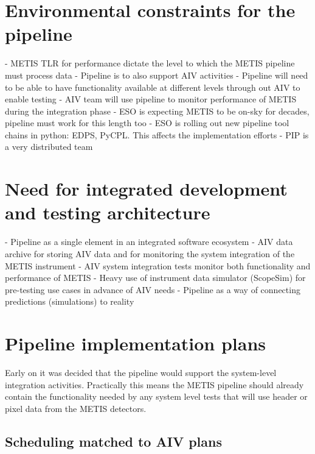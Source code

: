 \documentclass[a4paper]{spie}  %
\begin{document}
\section{Environmental constraints for the pipeline}
\label{sec:env}




- METIS TLR for performance dictate the level to which the METIS pipeline must process data
- Pipeline is to also support AIV activities
- Pipeline will need to be able to have functionality available at different levels through out AIV to enable testing
- AIV team will use pipeline to monitor performance of METIS during the integration phase
- ESO is expecting METIS to be on-sky for decades, pipeline must work for this length too
- ESO is rolling out new pipeline tool chains in python: EDPS, PyCPL. This affects the implementation efforts
- PIP is a very distributed team

\section{Need for integrated development and testing architecture}
\label{sec:dev}
- Pipeline as a single element in an integrated software ecosystem
- AIV data archive for storing AIV data and for monitoring the system integration of the METIS instrument
- AIV system integration tests monitor both functionality and performance of METIS
- Heavy use of instrument data simulator (ScopeSim) for pre-testing use cases in advance of AIV needs
- Pipeline as a way of connecting predictions (simulations) to reality


\section{Pipeline implementation plans}
\label{sec:imp}

Early on it was decided that the pipeline would support the system-level integration activities.
Practically this means the METIS pipeline should already contain the functionality needed by any system level tests that will use header or pixel data from the METIS detectors.



\subsection{Scheduling matched to AIV plans}
\label{subsec:imp_aiv}
\end{document}
